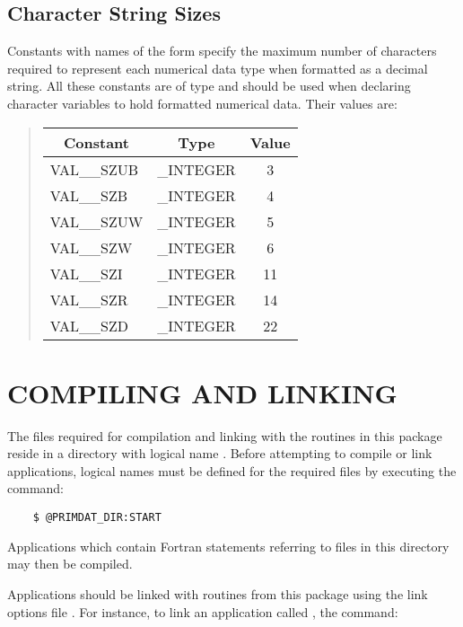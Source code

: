 \subsection{Character String Sizes}

Constants with names of the form  specify the maximum
number of characters required to represent each numerical data type when
formatted as a decimal string. 
All these constants are of type  and should be used when
declaring character variables to hold formatted numerical data. 
Their values are:

\begin{quote}
\begin{center}
\begin{tabular}{|l|l|c|}
\hline
\multicolumn{1}{|c|}{\bf Constant} &
\multicolumn{1}{c|}{\bf Type} &
{\bf Value} \\ 
\hline
VAL\_\_SZUB & \_INTEGER & 3 \\
VAL\_\_SZB & \_INTEGER & 4 \\
VAL\_\_SZUW & \_INTEGER & 5 \\
VAL\_\_SZW & \_INTEGER & 6 \\
VAL\_\_SZI & \_INTEGER & 11 \\
VAL\_\_SZR & \_INTEGER & 14 \\
VAL\_\_SZD & \_INTEGER & 22 \\
\hline
\end{tabular}
\end{center}
\end{quote}

\section{COMPILING AND LINKING}

The files required for compilation and linking with the routines in this
package reside in a directory with logical name . 
Before attempting to compile or link applications, logical names must be
defined for the required files by executing the  command:

\begin{verbatim}
    $ @PRIMDAT_DIR:START
\end{verbatim}

Applications which contain Fortran  statements referring to
files in this directory may then be compiled. 

Applications should be linked with routines from this package using the link
options file . 
For instance, to link an application called , the 
command: 

